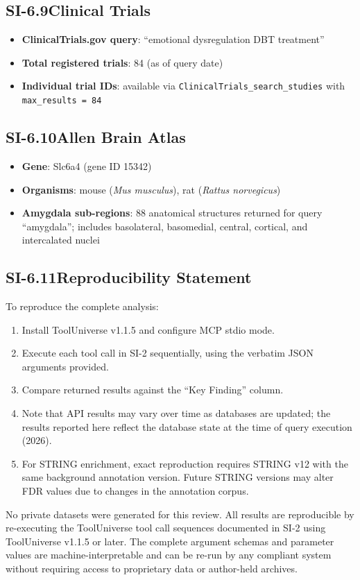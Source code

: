 \subsection*{SI-6.9\quad Clinical Trials}

\begin{itemize}[nosep]
  \item \textbf{ClinicalTrials.gov query}: ``emotional dysregulation DBT
        treatment''
  \item \textbf{Total registered trials}: 84 (as of query date)
  \item \textbf{Individual trial IDs}: available via
        \texttt{ClinicalTrials\_search\_studies} with
        \texttt{max\_results = 84}
\end{itemize}

\subsection*{SI-6.10\quad Allen Brain Atlas}

\begin{itemize}[nosep]
  \item \textbf{Gene}: Slc6a4 (gene ID 15342)
  \item \textbf{Organisms}: mouse (\textit{Mus musculus}), rat
        (\textit{Rattus norvegicus})
  \item \textbf{Amygdala sub-regions}: 88 anatomical structures returned for
        query ``amygdala''; includes basolateral, basomedial, central,
        cortical, and intercalated nuclei
\end{itemize}

\subsection*{SI-6.11\quad Reproducibility Statement}

To reproduce the complete analysis:

\begin{enumerate}[nosep]
  \item Install ToolUniverse v1.1.5 and configure MCP stdio mode.
  \item Execute each tool call in SI-2 sequentially, using the verbatim
        JSON arguments provided.
  \item Compare returned results against the ``Key Finding'' column.
  \item Note that API results may vary over time as databases are updated;
        the results reported here reflect the database state at the time
        of query execution (2026).
  \item For STRING enrichment, exact reproduction requires STRING v12 with
        the same background annotation version.  Future STRING versions may
        alter FDR values due to changes in the annotation corpus.
\end{enumerate}

\noindent
No private datasets were generated for this review. All results are reproducible
by re-executing the ToolUniverse tool call sequences documented in SI-2 using
ToolUniverse v1.1.5 or later. The complete argument schemas and parameter values
are machine-interpretable and can be re-run by any compliant system without
requiring access to proprietary data or author-held archives.